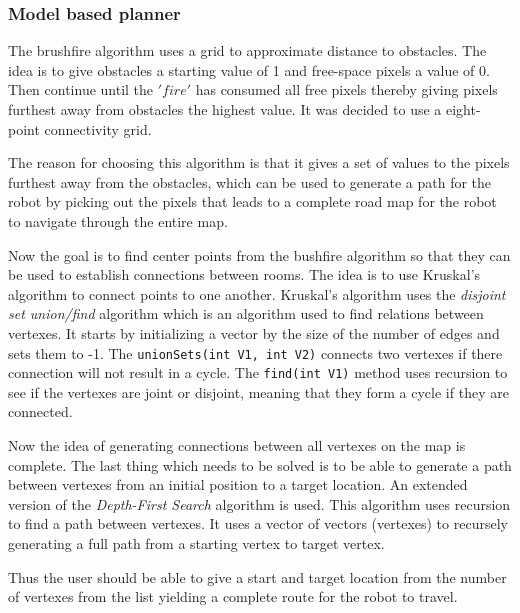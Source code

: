 \documentclass[../Head/Main.tex]{subfiles}
\begin{document}
\subsubsection{Model based planner}
The brushfire algorithm uses a grid to approximate distance to obstacles. The idea is to give obstacles a starting value of 1 and free-space pixels a value of 0. Then continue until the $'fire'$ has consumed all free pixels thereby giving pixels furthest away from obstacles the highest value. It was decided to use a eight-point connectivity grid. \par
{}


The reason for choosing this algorithm is that it gives a set of values to the pixels furthest away from the obstacles, which can be used to generate a path for the robot by picking out the pixels that leads to a complete road map for the robot to navigate through the entire map. \par
{}
Now the goal is to find center points from the bushfire algorithm so that they can be used to establish connections between rooms. The idea is to use Kruskal's algorithm to connect points to one another.  Kruskal's algorithm uses the \textit{disjoint set union/find} algorithm which is an algorithm used to find relations between vertexes. It starts by initializing a vector by the size of the number of edges and sets them to -1. The \texttt{unionSets(int V1, int V2)} connects two vertexes if there connection will not result in a cycle.  The \texttt{find(int V1)} method uses recursion to see if the vertexes are joint or disjoint, meaning that they form a cycle if they are connected.


Now the idea of generating connections between all vertexes on the map is complete. The last thing which needs to be solved is to be able to generate a path between vertexes from an initial position to a target location. An extended version of the \textit{Depth-First Search} algorithm is used. This algorithm uses recursion to find a path between vertexes. It uses a vector of vectors (vertexes) to recursely generating a full path from a starting vertex to target vertex. 

Thus the user should be able to give a start and target location from the number of vertexes from the list yielding a complete route for the robot to travel.
\end{document}
